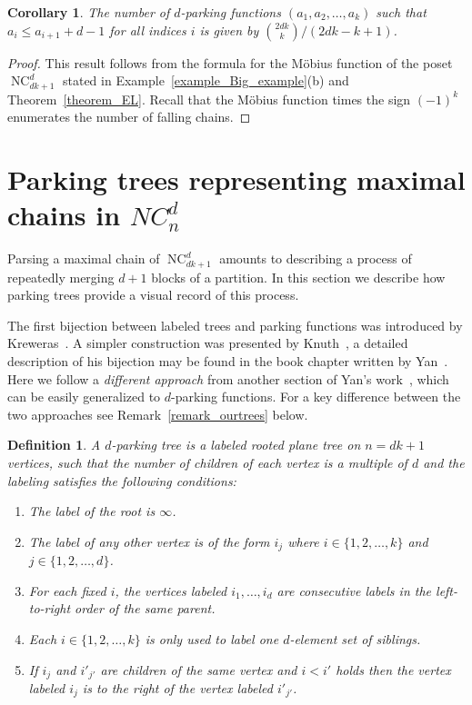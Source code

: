 \documentclass[11pt]{amsart}
\newtheorem{definition}[theorem]{Definition}
\newtheorem{corollary}[theorem]{Corollary}
\numberwithin{equation}{section}
\DeclareMathOperator{\NC}{NC}
\begin{document}
\begin{corollary}
The number of $d$-parking functions $(a_{1}, a_{2}, \ldots, a_{k})$
such that $a_{i} \leq a_{i+1} + d-1$ for all indices $i$ is given by
$\binom{2dk}{k}/(2dk-k+1)$.
\label{corollary_falling_chains}
\end{corollary}
\begin{proof}
This result follows from the formula for the M\"obius function of the
poset $\NC^{d}_{dk+1}$ stated in Example~\ref{example_Big_example}(b)
and Theorem~\ref{theorem_EL}.
Recall that the M\"obius function times the sign $(-1)^{k}$ enumerates
the number of falling chains.
\end{proof}


\section{Parking trees representing maximal chains in $NC^{d}_{n}$}
\label{section_tree_representation}

Parsing a maximal chain of $\NC^{d}_{dk+1}$ amounts to describing a process
of repeatedly merging $d+1$ blocks of a partition. In this
section we describe how parking trees provide a visual record
of this process.

The first bijection between labeled trees and parking functions was
introduced by Kreweras~\cite{Kreweras_suites}. A simpler construction was
presented by Knuth~\cite[Section~6.4, Exercise 31, solution (c)]{Knuth}, a
detailed description of his bijection may be found in the book chapter written
by Yan~\cite[Section~13.2.2]{Yan_chapter}. Here we follow a {\em different
approach} from another section of Yan's
work~\cite[Section~13.2.3]{Yan_chapter}, which can be easily generalized
to $d$-parking functions. For a key difference between the two
approaches see Remark~\ref{remark_ourtrees} below.

\begin{definition}
  \label{definition_parking_tree}
A {\em $d$-parking tree} is a labeled rooted plane tree on $n=dk+1$ vertices, such that
the number of children of each vertex is a multiple of $d$ and the
labeling satisfies the following conditions:
\begin{enumerate}
\item The label of the root is $\infty$.
\item The label of any other vertex is of the form $i_{j}$ where $i\in
  \{1,2,\ldots,k\}$ and $j\in \{1,2,\ldots,d\}$.
\item For each fixed $i$, the vertices labeled $i_{1},\ldots,i_{d}$ are
  consecutive labels in the left-to-right order of the same parent.  
\item Each $i\in \{1,2,\ldots,k\}$ is only used to label one $d$-element
  set of siblings.  
\item If $i_{j}$ and $i'_{j'}$ are children of the same vertex and $i<i'$
  holds then the vertex labeled $i_{j}$ is to the {\em right} of the vertex
  labeled $i'_{j'}$. 
\end{enumerate}  
\end{definition}
\end{document}
